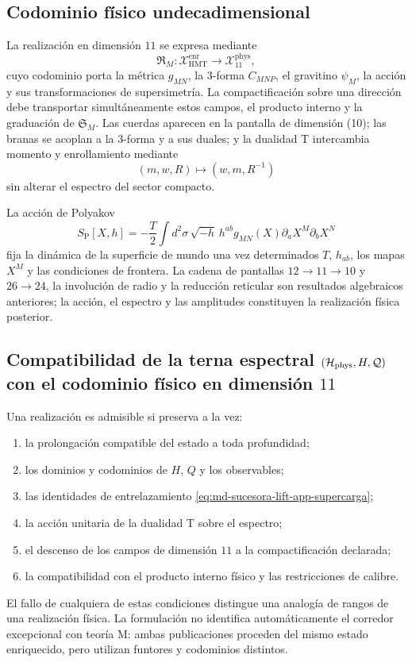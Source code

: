 \subsection{Codominio físico undecadimensional}

La realización en dimensión \(11\) se expresa mediante
\[
 \mathfrak R_M:\mathcal X_{\mathrm{HMT}}^{\mathrm{enr}}
 \longrightarrow
 \mathcal X_{11}^{\mathrm{phys}},
\]
cuyo codominio porta la métrica \(g_{MN}\), la \(3\)-forma \(C_{MNP}\), el
gravitino \(\psi_M\), la acción y sus transformaciones de supersimetría. La
compactificación sobre una dirección debe transportar simultáneamente estos
campos, el producto interno y la graduación de \(\mathfrak S_M\). Las cuerdas
aparecen en la pantalla de dimensión (10); las branas se acoplan a la
\(3\)-forma y a sus duales; y la dualidad T intercambia momento y
enrollamiento mediante
\[
 (m,w,R)\longmapsto(w,m,R^{-1})
\]
sin alterar el espectro del sector compacto.

La acción de Polyakov
\[
 S_{\mathrm P}[X,h]
 =-\frac{T}{2}\int d^2\sigma\,
 \sqrt{-h}\,h^{ab}g_{MN}(X)
 \partial_aX^M\partial_bX^N
\]
fija la dinámica de la superficie de mundo una vez determinados \(T\),
\(h_{ab}\), los mapas \(X^M\) y las condiciones de frontera. La cadena de
pantallas \(12\to11\to10\) y \(26\to24\), la involución de radio y la
reducción reticular son resultados algebraicos anteriores; la acción, el
espectro y las amplitudes constituyen la realización física posterior.

\subsection{Compatibilidad de la terna espectral \((\mathcal H_{\rm phys},H,\mathcal Q)\) con el codominio físico en dimensión \(11\)}

Una realización es admisible si preserva a la vez:
\begin{enumerate}
 \item la prolongación compatible del estado a toda profundidad;
 \item los dominios y codominios de \(H\), \(Q\) y los observables;
 \item las identidades de entrelazamiento
       \eqref{eq:md-sucesora-lift-app-supercarga};
 \item la acción unitaria de la dualidad T sobre el espectro;
 \item el descenso de los campos de dimensión \(11\) a la compactificación
       declarada;
 \item la compatibilidad con el producto interno físico y las restricciones
       de calibre.
\end{enumerate}
El fallo de cualquiera de estas condiciones distingue una analogía de rangos
de una realización física. La formulación no identifica automáticamente el
corredor excepcional con teoría M: ambas publicaciones proceden del mismo
estado enriquecido, pero utilizan funtores y codominios distintos.
